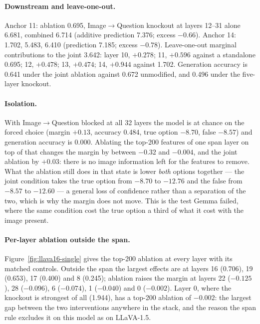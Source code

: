 \documentclass[11pt,a4paper]{article}
\begin{document}
\paragraph{Downstream and leave-one-out.} Anchor 11: ablation 0.695,
Image$\rightarrow$Question knockout at layers 12--31 alone 6.681, combined
6.714 (additive prediction 7.376; excess $-0.66$). Anchor 14: 1.702, 5.483,
6.410 (prediction 7.185; excess $-0.78$). Leave-one-out marginal contributions
to the joint 3.642: layer 10, $+0.278$; 11, $+0.596$ against a standalone
0.695; 12, $+0.478$; 13, $+0.474$; 14, $+0.944$ against 1.702. Generation
accuracy is 0.641 under the joint ablation against 0.672 unmodified, and 0.496
under the five-layer knockout.

\paragraph{Isolation.} With Image$\rightarrow$Question blocked at all 32 layers
the model is at chance on the forced choice (margin $+0.13$, accuracy 0.484,
true option $-8.70$, false $-8.57$) and generation accuracy is 0.000. Ablating
the top-200 features of one span layer on top of that changes the margin by
between $-0.32$ and $-0.004$, and the joint ablation by $+0.03$: there is no
image information left for the features to remove. What the ablation still does in
that state is lower \emph{both} options together --- the joint condition takes
the true option from $-8.70$ to $-12.76$ and the false from $-8.57$ to $-12.60$
--- a general loss of confidence rather than a separation of the two, which is
why the margin does not move. This is the test Gemma failed, where the same
condition cost the true option a third of what it cost with the image present.

\paragraph{Per-layer ablation outside the span.} Figure~\ref{fig:llava16-single}
gives the top-200 ablation at every layer with its matched controls. Outside the
span the largest effects are at layers 16 (0.706), 19 (0.653), 17 (0.400) and 8
(0.245); ablation raises the margin at layers 22 ($-0.125$), 28 ($-0.096$), 6
($-0.074$), 1 ($-0.040$) and 0 ($-0.002$). Layer 0, where the knockout is
strongest of all (1.944), has a top-200 ablation of $-0.002$: the largest gap
between the two interventions anywhere in the stack, and the reason the span rule
excludes it on this model as on LLaVA-1.5.
\end{document}
